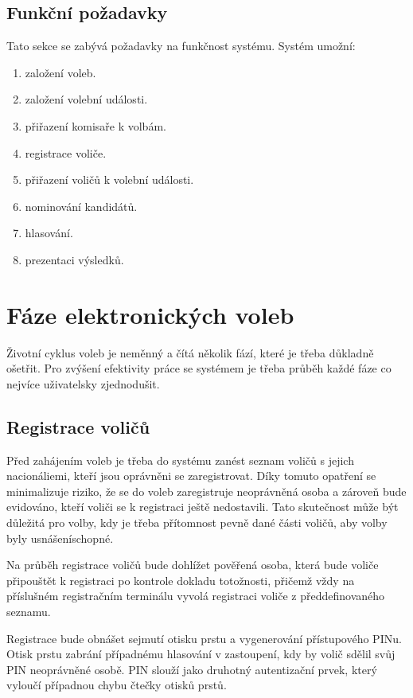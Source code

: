 \documentclass[11pt,twoside,a4paper]{book}
\begin{document}
\subsection{Funkční požadavky}

Tato sekce se zabývá požadavky na funkčnost systému. Systém umožní:

\begin{enumerate}
	\item založení voleb.
	\item založení volební události.
	\item přiřazení komisaře k volbám.
	\item registrace voliče.
	\item přiřazení voličů k volební události.
	\item nominování kandidátů.
	\item hlasování.
	\item prezentaci výsledků.
\end{enumerate}

\section{Fáze elektronických voleb}

Životní cyklus voleb je neměnný a čítá několik fází, které je třeba důkladně ošetřit. Pro zvýšení efektivity práce se systémem je třeba průběh každé fáze co nejvíce uživatelsky zjednodušit.

\subsection{Registrace voličů}

Před zahájením voleb je třeba do systému zanést seznam voličů s jejich nacionáliemi, kteří jsou oprávněni se zaregistrovat. Díky tomuto opatření se minimalizuje riziko, že se do voleb zaregistruje neoprávněná osoba a zároveň bude evidováno, kteří voliči se k registraci ještě nedostavili. Tato skutečnost může být důležitá pro volby, kdy je třeba přítomnost pevně dané části voličů, aby volby byly usnášeníschopné.  

Na průběh registrace voličů bude dohlížet pověřená osoba, která bude voliče připouštět k registraci po kontrole dokladu totožnosti, přičemž vždy na příslušném registračním terminálu vyvolá registraci voliče z předdefinovaného seznamu.

Registrace bude obnášet sejmutí otisku prstu a vygenerování přístupového PINu. Otisk prstu zabrání případnému hlasování v zastoupení, kdy by volič sdělil svůj PIN neoprávněné osobě. PIN slouží jako druhotný autentizační prvek, který vyloučí případnou chybu čtečky otisků prstů. 
\end{document}

